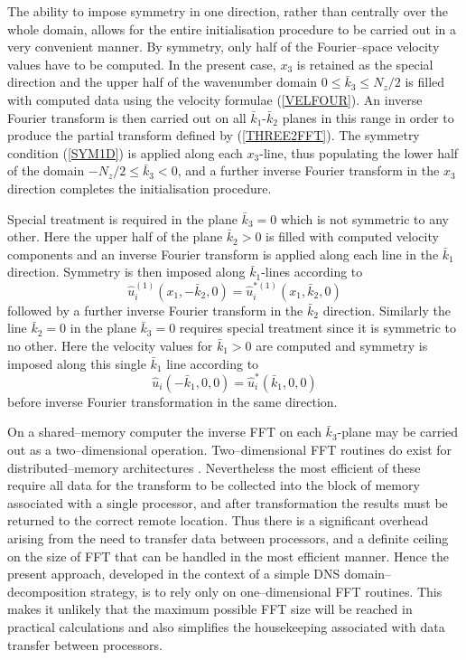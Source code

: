 \documentclass[dvips]{article}
\begin{document}
The ability to impose symmetry in one direction, rather than centrally
over the whole domain, allows for the entire initialisation procedure
to be carried out in a very convenient manner.  By symmetry, only half of the
Fourier--space velocity values have to be computed.
In the present case, $x_{3}$ is
retained as the special direction and the upper half of the wavenumber
domain $0 \le \bar{k}_{3} \le N_{z}/2$ is filled with computed data using the
velocity formulae (\ref{VELFOUR}).  An inverse Fourier transform is then
carried out on all $\bar{k}_{1}$-$\bar{k}_{2}$ planes in this range in order to
produce the partial transform defined by (\ref{THREE2FFT}).  The
symmetry condition (\ref{SYM1D}) is applied along each $x_{3}$-line,
thus populating the lower half of the domain $-N_{z}/2 \le \bar{k}_{3} < 0$, and
a further inverse Fourier transform in the $x_{3}$ direction completes
the initialisation procedure.

Special treatment is required in the
plane $\bar{k}_{3}=0$ which is not symmetric to any other.  Here the upper
half of the plane $\bar{k}_{2}>0$ is filled with computed velocity components
and an inverse Fourier transform is applied along each line in the
$\bar{k}_{1}$
direction.  Symmetry is then imposed along $\bar{k}_{1}$-lines according to
\[
\hat{u}_{i}^{(1)}(x_{1},-\bar{k}_{2},0) =
\hat{u}_{i}^{*(1)}(x_{1},\bar{k}_{2},0)
\]
followed by a further inverse Fourier transform in the $\bar{k}_{2}$ direction.
Similarly the line $\bar{k}_{2}=0$ in the plane $\bar{k}_{3}=0$ requires special
treatment since it is symmetric to no other.  Here the velocity values
for $\bar{k}_{1}>0$ are computed and symmetry is imposed along this
single $\bar{k}_{1}$
line according to
\[
\hat{u}_{i}(-\bar{k}_{1},0,0) = \hat{u}_{i}^{*}(\bar{k}_{1},0,0)
\]
before inverse Fourier transformation in the same direction.

On a shared--memory computer the inverse FFT on each $\bar{k}_{3}$-plane may
be carried out as a two--dimensional operation.  Two--dimensional FFT
routines do exist for distributed--memory architectures \cite{roballan}.
Nevertheless the most efficient
of these require all data for the transform to be collected into the block of
memory associated with a single processor, and after transformation the
results must be returned to the correct remote location.
Thus there is a significant
overhead arising from the need to transfer data between processors, and
a definite ceiling on the size of FFT that can be handled in the most efficient
manner.  Hence the present approach, developed in the context of a
simple DNS domain--decomposition strategy, is to rely only on one--dimensional
FFT routines.  This makes it unlikely that the maximum possible FFT
size will be reached in practical calculations
and also simplifies the housekeeping associated with data transfer
between processors.
\end{document}
